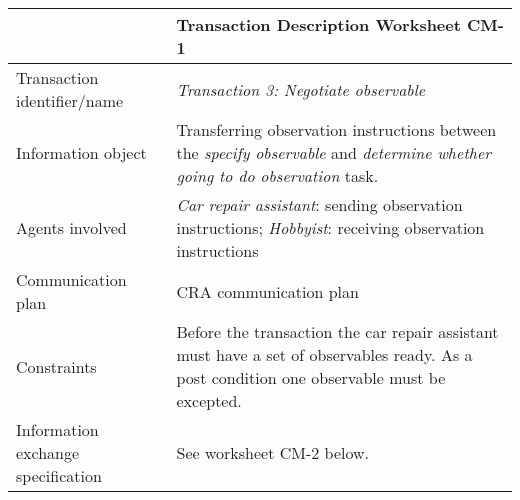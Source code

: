 \noindent
\begin{tabular}{%
       |>{\colleft}p{3cm}%
       |>{\colleft}p{8.5cm}|}
\hline
{\bf Communication model} &
   {\bf Transaction Description Worksheet CM-1} \\
\hline
\hline
\sc Transaction identifier/name &
	\emph{Transaction 3: Negotiate observable} \\

\hline
\sc Information object &
	Transferring observation instructions between the \emph{specify observable} and \emph{determine whether going to do observation} task. \\
\hline
\sc Agents involved &
	\emph{Car repair assistant}: sending observation instructions;\newline
	\emph{Hobbyist}: receiving observation instructions\\
\hline
\sc Communication plan &
	CRA communication plan\\

\hline
\sc Constraints &
	Before the transaction the car repair assistant must have a set of observables ready. As a post condition one observable must be excepted.\\

\hline
\sc Information exchange specification &
	See worksheet CM-2 below.\\

\hline
\end{tabular}


